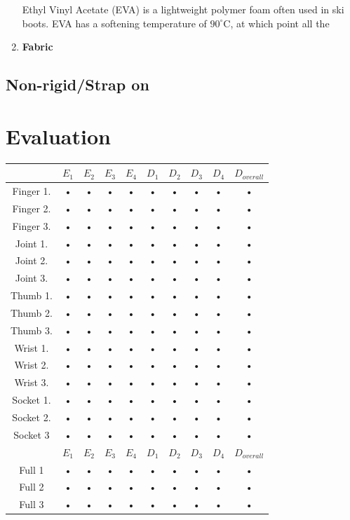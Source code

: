 \documentclass[11pt,3p]{report}
\begin{document}
\begin{multicols}{2}
\begin{enumerate}[noitemsep]
{		Ethyl Vinyl Acetate (EVA) is a lightweight polymer foam often used in ski boots. EVA has a softening temperature of $90^{\circ}$C, at which point all the 
		}
		\item \textbf{Fabric} {
		
		
		}
		\end{enumerate}
		
		\subsection{Non-rigid/Strap on}
		
				\pagebreak
			\end{multicols}	
	\section{Evaluation}
\begin{tabular}{|c|c|c|c|c|c|c|c|c||c|}
\hline 
 & $E_1$ & $E_2$ & $E_3$ & $E_4$ & $D_1$ & $D_2$ & $D_3$ & $D_4$ & $D_{overall}$ \\ 
\hline 
Finger 1. & • & • & • & • & • & • & • & • & •\\ 
\hline 
Finger 2. & • & • & • & • & • & • & • & • & •\\ 
\hline 
Finger 3. & • & • & • & • & • & • & • & • & •\\ 
\hline 
Joint 1. & • & • & • & • & • & • & • & • & •\\ 
\hline 
Joint 2. & • & • & • & • & • & • & • & • & •\\ 
\hline 
Joint 3. & • & • & • & • & • & • & • & • & •\\ 
\hline 
Thumb 1. & • & • & • & • & • & • & • & • & •\\ 
\hline 
Thumb 2. & • & • & • & • & • & • & • & • & •\\ 
\hline 
Thumb 3. & • & • & • & • & • & • & • & • & •\\ 
\hline 
Wrist 1. & • & • & • & • & • & • & • & • & •\\ 
\hline 
Wrist 2. & • & • & • & • & • & • & • & • & •\\ 
\hline 
Wrist 3. & • & • & • & • & • & • & • & • & •\\ 
\hline 
Socket 1. & • & • & • & • & • & • & • & • & •\\ 
\hline 
Socket 2. & • & • & • & • & • & • & • & • & •\\ 
\hline 
Socket 3 & • & • & • & • & • & • & • & • & •\\
\hline
\hline 
 & $E_1$ & $E_2$ & $E_3$ & $E_4$ & $D_1$ & $D_2$ & $D_3$ & $D_4$ & $D_{overall}$ \\
\hline 
Full 1 & • & • & • & • & • & • & • & • & • \\ 
\hline 
Full 2 & • & • & • & • & • & • & • & • & • \\ 
\hline 
Full 3 & • & • & • & • & • & • & • & • & • \\ 
\hline 
\end{tabular} 
\end{document}
